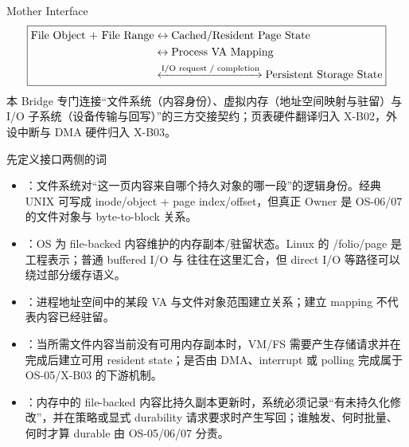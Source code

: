 \documentclass[UTF8,fontset=none,11pt,a4paper]{ctexart}
\begin{document}

\begin{corebox}{Mother Interface}
\[
\boxed{
\begin{aligned}
\text{File Object + File Range} &\leftrightarrow \text{Cached/Resident Page State} \\
&\leftrightarrow \text{Process VA Mapping} \\
&\xleftrightarrow{\text{I/O request / completion}} \text{Persistent Storage State}
\end{aligned}
}
\]
本 Bridge 专门连接“文件系统（内容身份）、虚拟内存（地址空间映射与驻留）与 I/O 子系统（设备传输与回写）”的三方交接契约；页表硬件翻译归入 X-B02，外设中断与 DMA 硬件归入 X-B03。
\end{corebox}

\begin{methodbox}{先定义接口两侧的词}
\begin{itemize}
  \item {}：文件系统对“这一页内容来自哪个持久对象的哪一段”的逻辑身份。经典 UNIX 可写成 inode/object + page index/offset，但真正 Owner 是 OS-06/07 的文件对象与 byte-to-block 关系。
  \item {}：OS 为 file-backed 内容维护的内存副本/驻留状态。Linux 的 /folio/page 是工程表示；普通 buffered I/O 与  往往在这里汇合，但 direct I/O 等路径可以绕过部分缓存语义。
  \item {}：进程地址空间中的某段 VA 与文件对象范围建立关系；建立 mapping 不代表内容已经驻留。
  \item {}：当所需文件内容当前没有可用内存副本时，VM/FS 需要产生存储请求并在完成后建立可用 resident state；是否由 DMA、interrupt 或 polling 完成属于 OS-05/X-B03 的下游机制。
  \item {}：内存中的 file-backed 内容比持久副本更新时，系统必须记录“有未持久化修改”，并在策略或显式 durability 请求要求时产生写回；谁触发、何时批量、何时才算 durable 由 OS-05/06/07 分责。
\end{itemize}
\end{methodbox}
\end{document}
